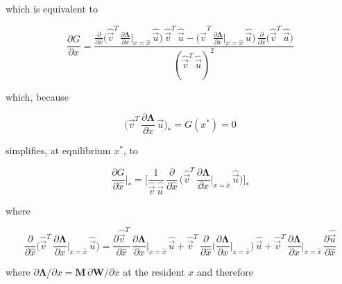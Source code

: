 which is equivalent to

\begin{equation}
    \frac{\partial G}{\partial \hat{x}} = \frac{\frac{\partial}{\partial \hat{x}} \big( \hat{\overrightarrow{v}}^T\,\frac{\partial \pmb{\Lambda}}{\partial x}\big|_{x=\hat{x}}\,\hat{\overrightarrow{u}} \big)\,\hat{\overrightarrow{v}}^T\,\hat{\overrightarrow{u}} - \big( \hat{\overrightarrow{v}}^T\,\frac{\partial \pmb{\Lambda}}{\partial x}\big|_{x=\hat{x}}\,\hat{\overrightarrow{u}} \big)\,\frac{\partial}{\partial \hat{x}} \big(\hat{\overrightarrow{v}}^T\,\hat{\overrightarrow{u}}\big)}{(\hat{\overrightarrow{v}}^T\,\hat{\overrightarrow{u}})^2}
    \label{eq:deriv_gradient}
\end{equation}

which, because

\begin{equation}
    \bigg( \overrightarrow{v}^T\,\frac{\partial \pmb \Lambda}{\partial x}\,\overrightarrow{u} \bigg)_* = G(x^*) = 0
    \label{eq:gradient_is_zero_at_equilibrium}
\end{equation}

simplifies, at equilibrium $x^*$, to

\begin{equation}
    \frac{\partial G}{\partial \hat x}\bigg|_* = \Bigg[ \frac{1}{\hat{\overrightarrow{v}}\,\hat{\overrightarrow{u}}} \, \frac{\partial}{\partial \hat x}\,\bigg(\hat{\overrightarrow{v}}^T\,\frac{\partial \pmb \Lambda}{\partial x}\bigg|_{x=\hat x}\,\hat{\overrightarrow{u}}\bigg)\Bigg]_*
    \label{eq:deriv_gradient_equilibrium}
\end{equation}

where

\begin{equation}
    \frac{\partial}{\partial \hat{x}} \bigg( \hat{\overrightarrow{v}}^T\,\frac{\partial \pmb{\Lambda}}{\partial x}\bigg|_{x=\hat{x}}\,\hat{\overrightarrow{u}} \bigg) = \frac{\partial \hat{\overrightarrow{v}}^T}{\partial \hat{x}}\,\frac{\partial \pmb{\Lambda}}{\partial x}\bigg|_{x=\hat{x}}\,\hat{\overrightarrow{u}} + \hat{\overrightarrow{v}}^T\,\frac{\partial}{\partial \hat{x}} \bigg(\frac{\partial \pmb{\Lambda}}{\partial x}\bigg|_{x=\hat{x}}\bigg)\,\hat{\overrightarrow{u}} + \hat{\overrightarrow{v}}^T\,\frac{\partial \pmb{\Lambda}}{\partial x}\bigg|_{x=\hat{x}}\,\frac{\partial \hat{\overrightarrow{u}}}{\partial \hat{x}}
\end{equation}

where $\partial \pmb \Lambda / \partial x = \pmb M \, \partial \pmb W / \partial x$ at the resident $\hat x$ and therefore


